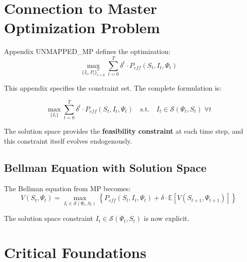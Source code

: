 \section{Connection to Master Optimization Problem}
\label{sec:ss-mp-connection}

Appendix UNMAPPED_MP defines the optimization:
\begin{equation}
\max_{\{I_t, P_t\}_{t=0}^T} \sum_{t=0}^{T} \delta^t \cdot P_{eff}(S_t, I_t, \Psi_t)
\end{equation}

This appendix specifies the constraint set. The complete formulation is:

\begin{equation}
\boxed{
\max_{\{I_t\}} \sum_{t=0}^{T} \delta^t \cdot P_{eff}(S_t, I_t, \Psi_t) \quad \text{s.t.} \quad I_t \in \mathcal{S}(\Psi_t, S_t) \; \forall t
}
\end{equation}

The solution space provides the \textbf{feasibility constraint} at each time step, and this constraint itself evolves endogenously.

\subsection{Bellman Equation with Solution Space}

The Bellman equation from MP becomes:
\begin{equation}
V(S_t, \Psi_t) = \max_{I_t \in \mathcal{S}(\Psi_t, S_t)} \left\{ P_{eff}(S_t, I_t, \Psi_t) + \delta \cdot \mathbb{E}[V(S_{t+1}, \Psi_{t+1})] \right\}
\end{equation}

The solution space constraint $I_t \in \mathcal{S}(\Psi_t, S_t)$ is now explicit.

\section{Critical Foundations}
\label{sec:ss-foundations}

